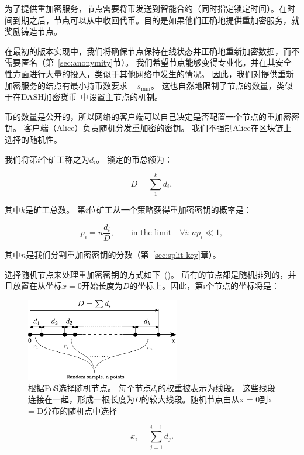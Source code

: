 \documentclass[longbibliography,nofootinbib]{revtex4-1}
\begin{document}
为了提供重加密服务，节点需要将币发送到智能合约（同时指定锁定时间）。在时间到期之后，节点可以从中收回代币。目的是如果他们正确地提供重加密服务，就奖励铸造节点。

    在最初的版本实现中，我们将确保节点保持在线状态并正确地重新加密数据，而不需要匿名（第~\ref{sec:anonymity}节）。 我们希望节点能够变得专业化，并在其安全性方面进行大量的投入，类似于其他网络中发生的情况。 因此，我们对提供重新加密服务的结点有最小持币数要求 – $s_{\min}$。 这也自然地限制了节点的数量，类似于在DASH加密货币~\cite{dash:whitepaper}中设置主节点的机制。
    
    币的数量是公开的，所以网络的客户端可以自己决定是否配置一个节点的重加密密钥。 客户端（Alice）负责随机分发重加密的密钥。 我们不强制Alice在区块链上选择的随机性。
    
    我们将第$i$个矿工称之为$d_i$。 锁定的币总额为：

\begin{equation}
    D = \sum_1^k d_i,
\end{equation}

其中$k$是矿工总数。 第$i$位矿工从一个策略获得重加密密钥的概率是：

\begin{equation}
    p_i = n\frac{d_i}{D},\qquad\text{in the limit}\quad \forall i: n p_i \ll 1,
\end{equation}

	其中$n$是我们分割重加密密钥的分数（第~\ref{sec:split-key}章）。

    选择随机节点来处理重加密密钥的方式如下~()。 所有的节点都是随机排列的，并且放置在从坐标$x=0$开始长度为$D$的坐标上。因此，第$i$个节点的坐标将是：
    
\begin{figure}
    \centering
    \includegraphics[width=0.6\textwidth]{pdf/miners-ruler.pdf}
    \caption{根据PoS选择随机节点。 每个节点$d_i$的权重被表示为线段。 这些线段连接在一起，形成一根长度为$D$的较大线段。随机节点由从x = 0到x = D分布的随机点中选择}
    \label{fig:random-nodes}
\end{figure}
\begin{equation}
    x_i = \sum_{j=1}^{i-1} d_j.
\end{equation}
\end{document}
